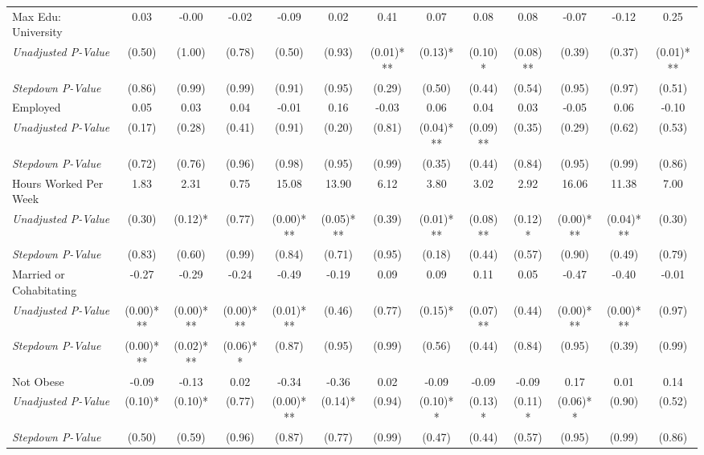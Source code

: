 \begin{tabular}{l c c c c c c c c c c c c}
Max Edu: University & 0.03 & -0.00 & -0.02 & -0.09 & 0.02 & 0.41 & 0.07 & 0.08 & 0.08 & -0.07 & -0.12 & 0.25 \\
\quad \textit{Unadjusted P-Value} & (0.50) & (1.00) & (0.78) & (0.50) & (0.93) & (0.01)*** & (0.13)* & (0.10)* & (0.08)** & (0.39) & (0.37) & (0.01)*** \\
\quad \textit{Stepdown P-Value} & (0.86) & (0.99) & (0.99) & (0.91) & (0.95) & (0.29) & (0.50) & (0.44) & (0.54) & (0.95) & (0.97) & (0.51) \\
Employed & 0.05 & 0.03 & 0.04 & -0.01 & 0.16 & -0.03 & 0.06 & 0.04 & 0.03 & -0.05 & 0.06 & -0.10 \\
\quad \textit{Unadjusted P-Value} & (0.17) & (0.28) & (0.41) & (0.91) & (0.20) & (0.81) & (0.04)*** & (0.09)** & (0.35) & (0.29) & (0.62) & (0.53) \\
\quad \textit{Stepdown P-Value} & (0.72) & (0.76) & (0.96) & (0.98) & (0.95) & (0.99) & (0.35) & (0.44) & (0.84) & (0.95) & (0.99) & (0.86) \\
Hours Worked Per Week & 1.83 & 2.31 & 0.75 & 15.08 & 13.90 & 6.12 & 3.80 & 3.02 & 2.92 & 16.06 & 11.38 & 7.00 \\
\quad \textit{Unadjusted P-Value} & (0.30) & (0.12)* & (0.77) & (0.00)*** & (0.05)*** & (0.39) & (0.01)*** & (0.08)** & (0.12)* & (0.00)*** & (0.04)*** & (0.30) \\
\quad \textit{Stepdown P-Value} & (0.83) & (0.60) & (0.99) & (0.84) & (0.71) & (0.95) & (0.18) & (0.44) & (0.57) & (0.90) & (0.49) & (0.79) \\
Married or Cohabitating & -0.27 & -0.29 & -0.24 & -0.49 & -0.19 & 0.09 & 0.09 & 0.11 & 0.05 & -0.47 & -0.40 & -0.01 \\
\quad \textit{Unadjusted P-Value} & (0.00)*** & (0.00)*** & (0.00)*** & (0.01)*** & (0.46) & (0.77) & (0.15)* & (0.07)** & (0.44) & (0.00)*** & (0.00)*** & (0.97) \\
\quad \textit{Stepdown P-Value} & (0.00)*** & (0.02)*** & (0.06)** & (0.87) & (0.95) & (0.99) & (0.56) & (0.44) & (0.84) & (0.95) & (0.39) & (0.99) \\
Not Obese & -0.09 & -0.13 & 0.02 & -0.34 & -0.36 & 0.02 & -0.09 & -0.09 & -0.09 & 0.17 & 0.01 & 0.14 \\
\quad \textit{Unadjusted P-Value} & (0.10)* & (0.10)* & (0.77) & (0.00)*** & (0.14)* & (0.94) & (0.10)** & (0.13)* & (0.11)* & (0.06)** & (0.90) & (0.52) \\
\quad \textit{Stepdown P-Value} & (0.50) & (0.59) & (0.96) & (0.87) & (0.77) & (0.99) & (0.47) & (0.44) & (0.57) & (0.95) & (0.99) & (0.86) \\

\end{tabular}
